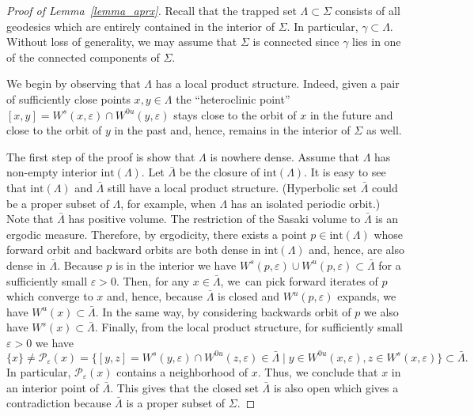 \documentclass[JEP,XML,SOM,Unicode,NoFloatCountersInSection]{cedram}
\let\sep\mid
\newcommand{\Int}{\mathrm{int}}
\theoremstyle{definition}
\let\eps\varepsilon
\renewcommand{\>}{{\rangle}}
\newcommand{\<}{{\langle}}
\begin{document}
\begin{proof}[Proof of Lemma~\ref{lemma_aprx}]
Recall that the trapped set $\Lambda\subset\Sigma$ consists of all geodesics which are entirely contained in the interior of $\Sigma$. In particular, $\gamma\subset\Lambda$. Without loss of generality, we may assume that $\Sigma$ is connected since $\gamma$ lies in one of the connected components of $\Sigma$.

We begin by observing that $\Lambda$ has a local product structure. Indeed, given a pair of sufficiently close points $x,y\in\Lambda$ the ``heteroclinic point'' $[x,y]= W^s(x,\eps)\cap W^{0u}(y,\eps)$ stays close to the orbit of $x$ in the future and close to the orbit of $y$ in the past and, hence, remains in the interior of $\Sigma$ as well.

The first step of the proof is show that $\Lambda$ is nowhere dense. Assume that $\Lambda$ has non-empty interior $\Int(\Lambda)$. Let $\bar\Lambda$ be the closure of $\Int(\Lambda)$. It is easy to see that $\Int(\Lambda)$ and $\bar\Lambda$ still have a local product structure. (Hyperbolic set $\bar\Lambda$ could be a proper subset of $\Lambda$, for example, when $\Lambda$ has an isolated periodic orbit.) Note that $\bar\Lambda$ has positive volume. The restriction of the Sasaki volume to $\bar \Lambda$ is an ergodic measure. Therefore, by ergodicity, there exists a point $p\in \Int(\Lambda)$ whose forward orbit and backward orbits are both dense in $\Int(\Lambda)$ and, hence, are also dense in $\bar\Lambda$. Because $p$ is in the interior we have $W^s(p,\eps)\cup W^u(p,\eps)\subset\bar\Lambda$ for a sufficiently small $\eps>0$. Then, for any $x\in\bar\Lambda$, we~can pick forward iterates of $p$ which converge to $x$ and, hence, because $\bar\Lambda$ is closed and $W^u(p,\eps)$ expands, we have $W^u(x)\subset \bar\Lambda$. In the same way, by considering backwards orbit of $p$ we also have $W^s(x)\subset \bar\Lambda$. Finally, from the local product structure, for sufficiently small $\varepsilon>0$ we have\vspace*{-3pt}\enlargethispage{.5\baselineskip}
\[
\{x\}\neq\mathcal P_{\varepsilon}(x) = \bigl\{[y,z]=W^s(y,\varepsilon)\cap W^{0u}(z,\varepsilon)\in\bar\Lambda \sep y\in W^{0u}(x,\varepsilon), z\in W^{s}(x,\varepsilon)\bigr\}\subset\bar\Lambda.
\] In particular, $\mathcal P_{\varepsilon}(x)$ contains a neighborhood of $x$. Thus, we conclude that $x$ in an interior point of $\bar\Lambda$. This gives that the closed set $\bar\Lambda$ is also open which gives a contradiction because $\bar\Lambda$ is a proper subset of $\Sigma$.


\end{proof}
\end{document}

